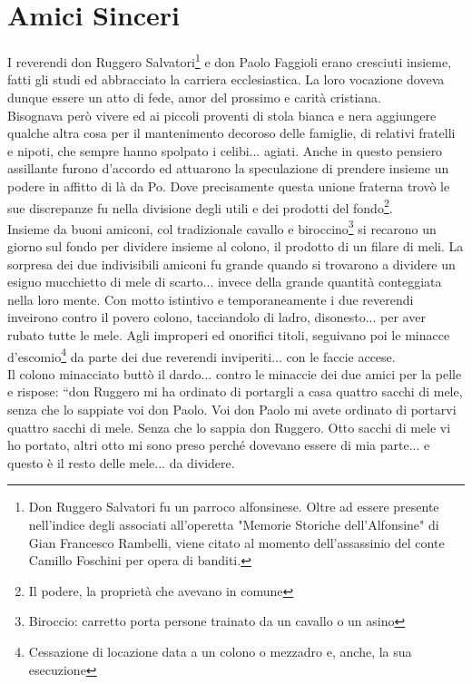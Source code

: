 
\chapter{Amici Sinceri}
I reverendi don Ruggero Salvatori\footnote{Don Ruggero Salvatori fu un parroco alfonsinese. Oltre ad essere presente nell'indice degli associati all'operetta "Memorie Storiche dell'Alfonsine" di Gian Francesco Rambelli, viene citato al momento dell'assassinio del conte Camillo Foschini per opera di banditi.} e don Paolo Faggioli erano cresciuti insieme, fatti gli studi ed abbracciato la carriera ecclesiastica. La loro vocazione doveva dunque essere un atto di fede, amor del prossimo e carità cristiana.\\
Bisognava però vivere ed ai piccoli proventi di stola bianca e nera aggiungere qualche altra cosa per il mantenimento decoroso delle famiglie, di relativi fratelli e nipoti, che sempre hanno spolpato i celibi... agiati. Anche in questo pensiero assillante furono d'accordo ed attuarono la speculazione di prendere insieme un podere in affitto di là da Po. Dove precisamente questa unione fraterna trovò le sue discrepanze fu nella divisione degli utili e dei prodotti del fondo\footnote{Il podere, la proprietà che avevano in comune}. \\
Insieme da buoni amiconi, col tradizionale cavallo e biroccino\footnote{Biroccio: carretto porta persone trainato da un cavallo o un asino} si recarono un giorno sul fondo per dividere insieme al colono, il prodotto di un filare di meli. La sorpresa dei due indivisibili amiconi fu grande quando si trovarono a dividere un esiguo mucchietto di mele di scarto... invece della grande quantità conteggiata nella loro mente. Con motto istintivo e temporaneamente i due reverendi inveirono contro il povero colono, tacciandolo di ladro, disonesto... per aver rubato tutte le mele. Agli improperi ed onorifici titoli, seguivano poi le minacce d’escomio\footnote{Cessazione di locazione data a un colono o mezzadro e, anche, la sua esecuzione} da parte dei due reverendi inviperiti... con le faccie accese.\\
Il colono minacciato buttò il dardo... contro le minaccie dei due amici per la pelle e rispose: “don Ruggero mi ha ordinato di portargli a casa quattro sacchi di mele, senza che lo sappiate voi don Paolo. Voi don Paolo mi avete ordinato di portarvi quattro sacchi di mele. Senza che lo sappia don Ruggero. Otto sacchi di mele vi ho portato, altri otto mi sono preso perché dovevano essere di mia parte... e questo è il resto delle mele... da dividere. 
